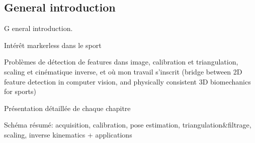 {}

\vspace*{-1cm}
\begin{flushright}
\section*{\fontsize{20pt}{20pt}\selectfont\textnormal{General introduction}}
\end{flushright}
\vspace{2cm}

\chead[\fancyplain{}{}]
      {\fancyplain{}{}}
\lfoot[\fancyplain{}{}]%
      {\fancyplain{}{}}
\cfoot[\fancyplain{}{\thepage}]
      {\fancyplain{}{\thepage}}
\rfoot[\fancyplain{}{}]%
     {\fancyplain{}{\scriptsize}}
     


\lettrine[lines=1]{G}{ }eneral introduction.


Intérêt markerless dans le sport

Problèmes de détection de features dans image, calibration et triangulation, scaling et cinématique inverse, et où mon travail s'inscrit (bridge between 2D feature detection in computer vision, and physically consistent 3D biomechanics for sports)

Présentation détaillée de chaque chapitre

Schéma résumé: acquisition, calibration, pose estimation, triangulation\&filtrage, scaling, inverse kinematics + applications



